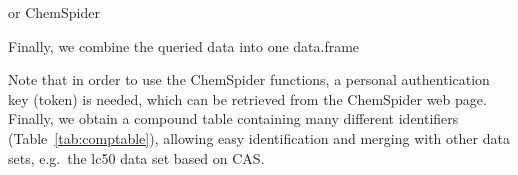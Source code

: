\begin{knitrout}
\color{fgcolor}\begin{kframe}
\begin{alltt}
 \hlkwb{<-} 
 \hlkwb{<-}   \hlstd{=} \hlstd{(}\hlstd{))}
 \hlkwb{<-} 
\end{alltt}
\end{kframe}
\end{knitrout}

or ChemSpider
\begin{knitrout}
\color{fgcolor}\begin{kframe}
\begin{alltt}
 \hlkwb{<-}   
 \hlkwb{<-}   
 \hlkwb{<-} 
\end{alltt}
\end{kframe}
\end{knitrout}

Finally, we combine the queried data into one data.frame
\begin{knitrout}
\color{fgcolor}\begin{kframe}
\begin{alltt}
 \hlkwb{<-} \hlstd{(}     
   \hlopt{$}    \hlopt{$}
   \hlstd{=} \hlstd{)}
\end{alltt}
\end{kframe}
\end{knitrout}

Note that in order to use the ChemSpider functions, a personal authentication key (token) is needed, which can be retrieved from the ChemSpider web page. 
Finally, we obtain a compound table containing many different identifiers (Table~\ref{tab:comptable}), allowing easy identification and merging with other data sets, e.g.\ the lc50 data set based on CAS.

